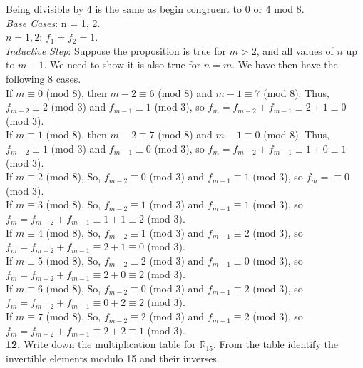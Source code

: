 \documentclass[paper=letter, fontsize=11pt]{scrartcl} %
\begin{document}
Being divisible by 4 is the same as begin congruent to 0 or 4 mod 8. \\
\textit{Base Cases}: n = 1, 2. \\
$n = 1, 2$: $f_1 = f_2 = 1$. \\

\textit{Inductive Step}: Suppose the proposition is true for $m > 2$, and all values
of $n$ up to $m - 1$. We need to show it is also true for $n = m$. We have then have
the following 8 cases. \\

If $m \equiv 0$ (mod 8), then $m - 2 \equiv 6$ (mod 8) and $m - 1 \equiv 7$ (mod 8).
Thus, $f_{m-2} \equiv 2$ (mod 3) and $f_{m-1} \equiv 1$ (mod 3), so
$f_m = f_{m-2} + f_{m-1} \equiv 2 + 1 \equiv 0$ (mod 3). \\

If $m \equiv 1$ (mod 8), then $m - 2 \equiv 7$ (mod 8) and $m - 1 \equiv 0$ (mod 8).
Thus, $f_{m-2} \equiv 1$ (mod 3) and $f_{m-1} \equiv 0$ (mod 3), so
$f_m = f_{m-2} + f_{m-1} \equiv 1 + 0 \equiv 1$ (mod 3). \\

If $m \equiv 2$ (mod 8), So, $f_{m-2} \equiv 0$ (mod 3) and $f_{m-1} \equiv 1$ (mod 3), so
$f_m = \equiv 0$ (mod 3). \\

If $m \equiv 3$ (mod 8), So, $f_{m-2} \equiv 1$ (mod 3) and $f_{m-1} \equiv 1$ (mod 3), so
$f_m = f_{m-2} + f_{m-1} \equiv 1 + 1 \equiv 2$ (mod 3). \\

If $m \equiv 4$ (mod 8), So, $f_{m-2} \equiv 1$ (mod 3) and $f_{m-1} \equiv 2$ (mod 3), so
$f_m = f_{m-2} + f_{m-1} \equiv 2 + 1 \equiv 0$ (mod 3). \\

If $m \equiv 5$ (mod 8), So, $f_{m-2} \equiv 2$ (mod 3) and $f_{m-1} \equiv 0$ (mod 3), so
$f_m = f_{m-2} + f_{m-1} \equiv 2 + 0 \equiv 2$ (mod 3). \\

If $m \equiv 6$ (mod 8), So, $f_{m-2} \equiv 0$ (mod 3) and $f_{m-1} \equiv 2$ (mod 3), so
$f_m = f_{m-2} + f_{m-1} \equiv 0 + 2 \equiv 2$ (mod 3). \\

If $m \equiv 7$ (mod 8), So, $f_{m-2} \equiv 2$ (mod 3) and $f_{m-1} \equiv 2$ (mod 3), so
$f_m = f_{m-2} + f_{m-1} \equiv 2 + 2 \equiv 1$ (mod 3). \\


\textbf{12.} Write down the multiplication table for $\mathbb{R}_{15}$. From the table
identify the invertible elements modulo 15 and their inverses. \\
\end{document}
